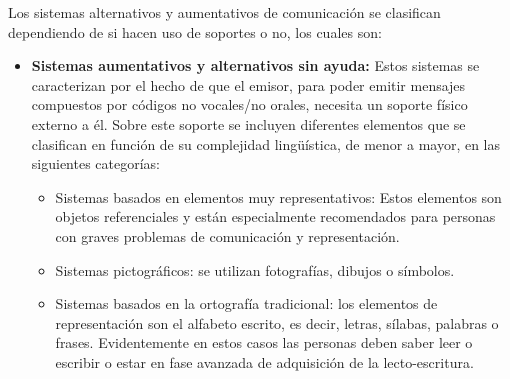 \documentclass[12pt]{report}%
\begin{document}
Los sistemas alternativos y aumentativos de comunicación se clasifican dependiendo de si hacen uso de soportes o no, los cuales son:

\begin{itemize}
\item \textbf{Sistemas aumentativos y alternativos sin ayuda:} Estos sistemas se caracterizan por el hecho de que el emisor, para poder emitir mensajes compuestos por códigos no vocales/no orales, necesita un soporte físico externo a él. Sobre este soporte se incluyen diferentes elementos que se clasifican en función de su complejidad lingüística, de menor a mayor, en las siguientes categorías:
\begin{itemize}
\item Sistemas basados en elementos muy representativos: Estos elementos son objetos referenciales y están especialmente recomendados para personas con graves problemas de comunicación y representación.
\item Sistemas pictográficos: se utilizan fotografías, dibujos o símbolos.
\item Sistemas basados en la ortografía tradicional: los elementos de representación son el alfabeto escrito, es decir, letras, sílabas, palabras o frases. Evidentemente en estos casos las personas deben saber leer o escribir o estar en fase avanzada de adquisición de la lecto-escritura.
\end{itemize}


\end{itemize}
\end{document}
